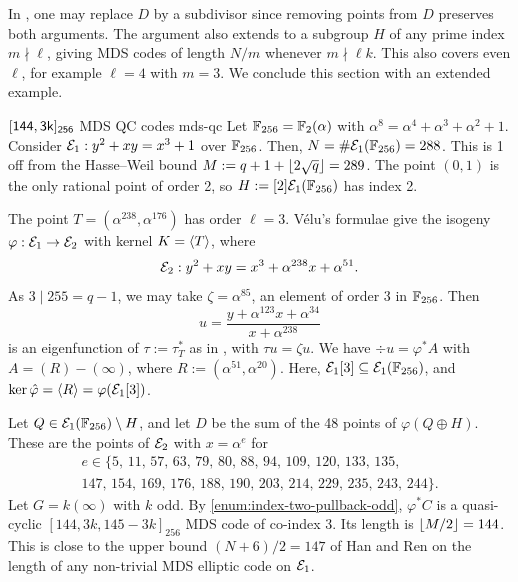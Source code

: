 \documentclass[twocolumn, 11pt]{scrartcl}
\begin{document}
In , one may replace $D$ by a subdivisor since removing points from $D$ preserves both arguments. The argument also extends to a subgroup $H$ of any prime index $m\nmid\ell$, giving MDS codes of length $N/m$ whenever $m\nmid\ell k$. This also covers even $\ell$, for example $\ell=4$ with $m=3$. We conclude this section with an extended example.

\begin{example}{$\sf{[144,3k]_{256}}$ MDS\hspace{-1pt} QC\hspace{-1pt} codes \cite{code-f256}}{mds-qc}
Let $\bbF_{256}=\bbF_2(\alpha)$ with $\alpha^8=\alpha^4+\alpha^3+\alpha^2+1$. Consider $\mcE_1:y^2+xy=x^3+1$ over $\bbF_{256}$. Then, $N=\#\mcE_1(\bbF_{256})=288$. This is 1 off from the Hasse--Weil bound $M:=q+1+\floor{2\sqrt q}=289$. The point $(0,1)$ is the only rational point of order 2, so $H:=[2]\mcE_1(\bbF_{256})$ has index 2.
 
The point $T=(\alpha^{238},\alpha^{176})$ has order $\ell=3$. V\'elu's formulae give the isogeny $\varphi:\mcE_1\to\mcE_2$ with kernel $K=\ang T$, where
\[ \mcE_2:y^2+xy=x^3+\alpha^{238}x+\alpha^{51}. \]
As $3\mid255=q-1$, we may take $\zeta=\alpha^{85}$, an element of order 3 in $\bbF_{256}$. Then
\[ u=\frac{y+\alpha^{123}x+\alpha^{34}}{x+\alpha^{238}} \]
is an eigenfunction of $\tau:=\tau_T^*$ as in , with $\tau u=\zeta u$. We have $\div u=\varphi^*A$ with $A=(R)-(\infty)$, where $R:=(\alpha^{51},\alpha^{20})$. Here, $\mcE_1[3]\subseteq\mcE_1(\bbF_{256})$, and $\ker\hat\varphi=\ang R=\varphi(\mcE_1[3])$.
 
Let $Q\in\mcE_1(\bbF_{256})\setminus H$, and let $D$ be the sum of the 48 points of $\varphi(Q\oplus H)$. These are the points of $\mcE_2$ with $x=\alpha^e$ for
\[ \begin{gathered}
\scriptstyle e\in\{5,\,11,\,57,\,63,\,79,\,80,\,88,\,94,\,109,\,120,\,133,\,135,\\[-6pt]
\scriptstyle 147,\,154,\,169,\,176,\,188,\,190,\,203,\,214,\,229,\,235,\,243,\,244\}.
\end{gathered} \]
Let $G=k(\infty)$ with $k$ odd. By \ref{enum:index-two-pullback-odd}, $\varphi^*C$ is a quasi-cyclic $[144,3k,145-3k]_{256}$ MDS code of co-index 3. Its length is $\floor{M/2}=144$. This is close to the upper bound $(N+6)/2=147$ of Han and Ren \cite[Thm.~1.2]{han2024maximal} on the length of any non-trivial MDS elliptic code on $\mcE_1$.


\end{example}
\end{document}
